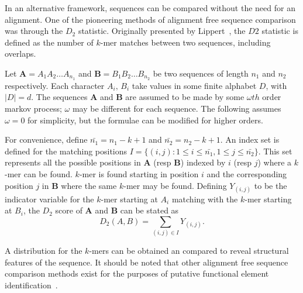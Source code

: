 



In an alternative framework, sequences can be compared without the need for an alignment. 
One of the pioneering methods of alignment free sequence comparison was through the $D_2$ statistic. Originally presented by Lippert~\cite{lippert2002distributional}, the $D2$ statistic is defined as the number of $k$-mer matches between two sequences, including overlaps.


Let $\mathbf{A} = A_1A_2\ldots A_{n_1}$ and $\mathbf{B}=B_1B_2\ldots B_{n_2}$ be two sequences of length $n_1$ and $n_2$ respectively. Each character $A_i,\,B_i$ take values in some finite alphabet $D$, with $|D| = d$.  The sequences $\mathbf{A}$ and $\mathbf{B}$ are assumed to be made by some $\omega th$ order markov process; $\omega$ may be different for each sequence. The following assumes $\omega = 0$ for simplicity, but the formulae can be modified for higher orders. 

For convenience, define $\bar{n_1} = n_1 - k + 1$ and $\bar{n_2} = n_2 - k + 1$. An index set is defined for the matching positions $I = \{(i,j): 1 \leq i \leq \bar{n_1}, 1 \leq j \leq \bar{n_2}\}$. This set represents all the possible positions in $\mathbf{A}$ (resp $\mathbf{B}$) indexed by $i$ (resp $j$) where a $k$-mer can be found. 
 $k$-mer is found starting in position $i$ and the corresponding position $j$ in $\mathbf{B}$ where the same $k$-mer may be found. 
Defining $Y_{(i,j)}$ to be the indicator variable for the $k$-mer starting at $A_i$ matching with the $k$-mer starting at $B_i$, the $D_2$ score of $\mathbf{A}$ and $\mathbf{B}$ can be stated as 
	\begin{equation}
		D_2(A,B) = \sum_{(i,j)\in I }Y_{(i,j)}.\label{eqn:AF}
	\end{equation}

A distribution for the $k$-mers can be obtained an compared to reveal structural features of the sequence. It should be noted that other alignment free sequence comparison methods exist for the purposes of putative functional element identification~\cite{arunachalam2010alignment, kantorovitz2007statistical, reinert2009alignment, wang2013cpat}. 

